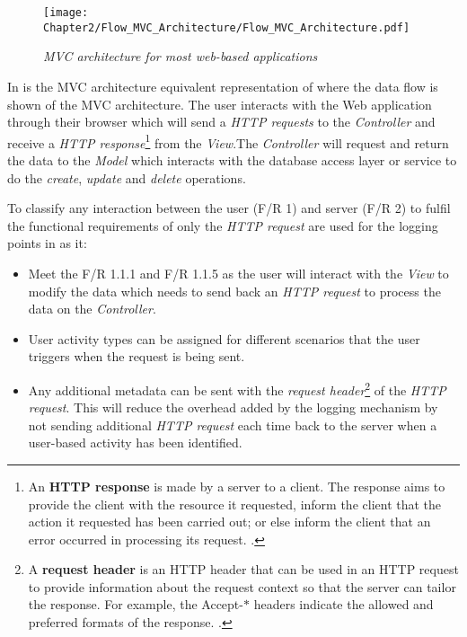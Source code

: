 \begin{figure}[!htb] %
	\centering %
	\texttt{[image: Chapter2/Flow\_MVC\_Architecture/Flow\_MVC\_Architecture.pdf]}
	\caption[MVC architecture for most web-based applications]
	{\textit{MVC architecture for most web-based applications \cite{Gu2010}}}\label{fig:ch2_flowMVC_Architecture}
\end{figure}

In  is the MVC architecture equivalent representation of  where the data flow is shown of the MVC architecture. The user interacts with the Web application through their browser which will send a \textit{HTTP requests} to the \textit{Controller} and receive a \textit{HTTP response}\footnote{An \textbf{HTTP response} is made by a server to a client. The response aims to provide the client with the resource it requested, inform the client that the action it requested has been carried out; or else inform the client that an error occurred in processing its request. \cite{IBM2021a}.} from the \textit{View}.The \textit{Controller} will request and return the data to the \textit{Model} which interacts with the database access layer or service to do the \textit{create}, \textit{update} and \textit{delete} operations.\par To classify any interaction between the user (F/R 1) and server (F/R 2) to fulfil the functional requirements of  only the \textit{HTTP request} are used for the logging points in  as it:

\begin{itemize}
	\item Meet the F/R 1.1.1 and F/R 1.1.5 as the user will interact with the \textit{View} to modify the data which needs to send back an \textit{HTTP request} to process the data on the \textit{Controller}.
	\item User activity types can be assigned for different scenarios that the user triggers when the request is being sent. 
	\item Any additional metadata can be sent with the \textit{request header}\footnote{A \textbf{request header} is an HTTP header that can be used in an HTTP request to provide information about the request context so that the server can tailor the response. For example, the Accept-$\ast$ headers indicate the allowed and preferred formats of the response. \cite{Mozilla2022}.} of the \textit{HTTP request}. This will reduce the overhead added by the logging mechanism by not sending additional \textit{HTTP request} each time back to the server when a user-based activity has been identified.
\end{itemize}

